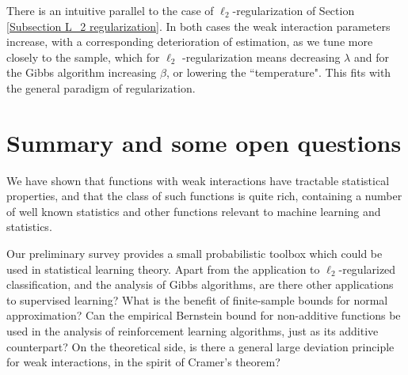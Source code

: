 \documentclass[final,12pt]{colt2018} %
\begin{document}
						There is an intuitive parallel to the case of $\ell _{2}$-regularization of
						Section \ref{Subsection L_2 regularization}. In both cases the weak
						interaction parameters increase, with a corresponding deterioration of
						estimation, as we tune more closely to the sample, which for $\ell _{2}$%
						-regularization means decreasing $\lambda $ and for the Gibbs algorithm
						increasing $\beta $, or lowering the ``temperature". This fits with the general paradigm of regularization. 
						
						
						\section{Summary and some open questions}
						We have shown that functions with weak interactions have tractable statistical properties, and that the class of such functions is quite rich, containing a number of 
						well known statistics and other functions relevant to machine learning and statistics. 
						
						Our preliminary survey provides a small probabilistic toolbox which could be used in statistical learning theory. Apart from the application to $\ell_2$-regularized classification, and the analysis of Gibbs algorithms, are there other applications to supervised learning? What is the benefit of finite-sample bounds for normal approximation? Can the empirical Bernstein bound for non-additive functions be used in the analysis of reinforcement learning algorithms, just as its additive counterpart? On the theoretical side, is there a general large deviation principle for weak interactions, in the spirit of Cramer's theorem?
						
						
						
\end{document}
